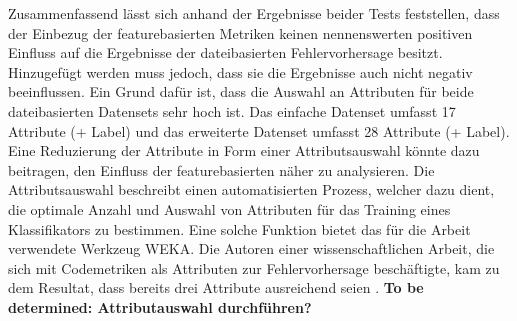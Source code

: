 Zusammenfassend lässt sich anhand der Ergebnisse beider Tests feststellen, dass der Einbezug der featurebasierten Metriken keinen nennenswerten positiven Einfluss auf die Ergebnisse der dateibasierten Fehlervorhersage besitzt. Hinzugefügt werden muss jedoch, dass sie die Ergebnisse auch nicht negativ beeinflussen. Ein Grund dafür ist, dass die Auswahl an Attributen für beide dateibasierten Datensets sehr hoch ist. Das \glqq einfache\grqq{} Datenset umfasst 17 Attribute (+ Label) und das erweiterte Datenset umfasst 28 Attribute (+ Label). Eine Reduzierung der Attribute in Form einer Attributsauswahl könnte dazu beitragen, den Einfluss der featurebasierten näher zu analysieren. Die Attributsauswahl beschreibt einen automatisierten Prozess, welcher dazu dient, die optimale Anzahl und Auswahl von Attributen für das Training eines Klassifikators zu bestimmen. Eine solche Funktion bietet das für die Arbeit verwendete Werkzeug WEKA. Die Autoren einer wissenschaftlichen Arbeit, die sich mit Codemetriken als Attributen zur Fehlervorhersage beschäftigte, kam zu dem Resultat, dass bereits drei Attribute ausreichend seien \cite{Wang2011}. \textbf{To be determined: Attributauswahl durchführen?} 



\cleardoublepage